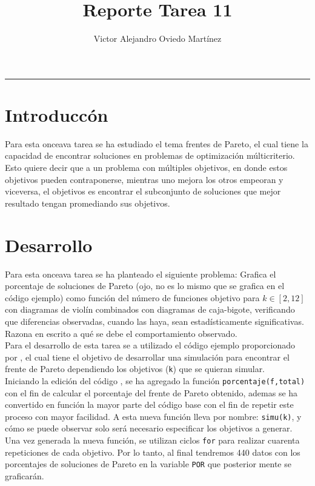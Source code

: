 \documentclass{article}
\title{Reporte Tarea 11}
\author{Victor Alejandro Oviedo Martínez}
\begin{document}
\maketitle
\hrule

\section{Introduccón}\label{intro}
Para esta onceava tarea \citep{DRA.P11} se ha estudiado el tema frentes de Pareto, el cual tiene la capacidad de encontrar soluciones en problemas de optimización múlticriterio. Esto quiere decir que a un problema con múltiples objetivos, en donde  estos objetivos pueden contraponerse, mientras uno mejora los otros empeoran y viceversa, el objetivos es encontrar el subconjunto de soluciones que mejor resultado tengan promediando sus objetivos.\\




\section{Desarrollo}

Para esta onceava tarea se ha planteado el siguiente problema: Grafica el porcentaje de soluciones de Pareto (ojo, no es lo mismo que se grafica en el código ejemplo) como función del número de funciones objetivo para 
$k \in [2,12]$ con diagramas de violín combinados con diagramas de caja-bigote, verificando que diferencias observadas, cuando las haya, sean estadísticamente significativas. Razona en escrito a qué se debe el comportamiento observado.\\


Para el desarrollo de esta tarea se a utilizado el código ejemplo proporcionado por \citet{DRA.Code}, el cual tiene el objetivo de desarrollar una simulación para encontrar el frente de Pareto dependiendo los objetivos (\texttt{k}) que se quieran simular.\\  

Iniciando la edición del código \citep{DRA.Code}, se ha agregado la función \texttt{porcentaje(f,total)} con el fin de calcular el porcentaje del frente de Pareto obtenido, ademas se ha convertido en función la mayor parte del código base con el fin  de repetir este proceso con mayor facilidad. A esta nueva función lleva por nombre: \texttt{simu(k)}, y cómo se puede observar solo será necesario especificar los objetivos a generar. Una vez generada la nueva función, se utilizan ciclos \texttt{for} para realizar cuarenta repeticiones de cada objetivo. Por lo tanto, al final tendremos 440 datos con los porcentajes de soluciones de Pareto en la variable \texttt{POR} que posterior mente se graficarán.
\end{document}
